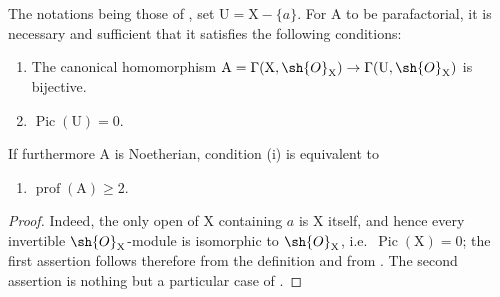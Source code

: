 \begin{proposition}[21.13.8]
\label{IV.21.13.8}
The notations being those of , set $\mathrm{U}=\mathrm{X}-\{a\}$.
For $\mathrm{A}$ to be parafactorial, it is necessary and sufficient that it satisfies the following conditions:
\begin{enumerate}[label=(\roman*)]
  \item The canonical homomorphism $\mathrm{A}=\Gamma(\mathrm{X},\sh{O}_{\mathrm{X}})\to\Gamma(\mathrm{U},\sh{O}_{\mathrm{X}})$ is bijective.
  \item $\operatorname{Pic}(\mathrm{U})=0$.
\end{enumerate}

If furthermore $\mathrm{A}$ is Noetherian, condition (i) is equivalent to
\begin{enumerate}
  \item[\textup{(i bis)}] $\operatorname{prof}(\mathrm{A})\geq 2$.
\end{enumerate}
\end{proposition}

\begin{proof}
Indeed, the only open of $\mathrm{X}$ containing $a$ is $\mathrm{X}$ itself, and hence every invertible $\sh{O}_{\mathrm{X}}$-module is isomorphic to $\sh{O}_{\mathrm{X}}$, i.e.\ $\operatorname{Pic}(\mathrm{X})=0$; the first assertion follows therefore from the definition  and from .
The second assertion is nothing but a particular case of .
\end{proof}

